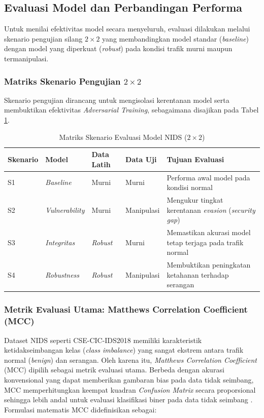 \documentclass[11pt, a4paper]{article}
\begin{document}
\subsection{Evaluasi Model dan Perbandingan Performa}
Untuk menilai efektivitas model secara menyeluruh, evaluasi dilakukan melalui skenario pengujian silang $2\times 2$ yang membandingkan model standar (\textit{baseline}) dengan model yang diperkuat (\textit{robust}) pada kondisi trafik murni maupun termanipulasi.

\subsubsection{Matriks Skenario Pengujian $2\times 2$}
Skenario pengujian dirancang untuk mengisolasi kerentanan model serta membuktikan efektivitas \textit{Adversarial Training}, sebagaimana disajikan pada Tabel \ref{tab:skenario_pengujian_2x2}.

\begin{table}[t]
\caption{Matriks Skenario Evaluasi Model NIDS ($2\times 2$)}
\label{tab:skenario_pengujian_2x2}
\centering
\vspace{0.2cm}
\small
\begin{tabular}{@{} p{} p{} p{} p{} p{} @{}}
\toprule
\textbf{Skenario} & \textbf{Model} & \textbf{Data Latih} & \textbf{Data Uji} & \textbf{Tujuan Evaluasi} \\ \midrule
S1 & \textit{Baseline} & Murni & Murni & Performa awal model pada kondisi normal \\ \addlinespace
S2 & \textit{Vulnerability} & Murni & Manipulasi & Mengukur tingkat kerentanan \textit{evasion} (\textit{security gap}) \\ \addlinespace
S3 & \textit{Integritas} & \textit{Robust} & Murni & Memastikan akurasi model tetap terjaga pada trafik normal \\ \addlinespace
S4 & \textit{Robustness} & \textit{Robust} & Manipulasi & Membuktikan peningkatan ketahanan terhadap serangan \\ \bottomrule
\end{tabular}
\end{table}

\subsubsection{Metrik Evaluasi Utama: Matthews Correlation Coefficient (MCC)}
Dataset NIDS seperti CSE-CIC-IDS2018 memiliki karakteristik ketidakseimbangan kelas (\textit{class imbalance}) yang sangat ekstrem antara trafik normal (\textit{benign}) dan serangan. Oleh karena itu, \textit{Matthews Correlation Coefficient} (MCC) \cite{ref_matthews} dipilih sebagai metrik evaluasi utama. Berbeda dengan akurasi konvensional yang dapat memberikan gambaran bias pada data tidak seimbang, MCC memperhitungkan keempat kuadran \textit{Confusion Matrix} secara proporsional sehingga lebih andal untuk evaluasi klasifikasi biner pada data tidak seimbang \cite{ref_chicco}. Formulasi matematis MCC didefinisikan sebagai:
\end{document}
